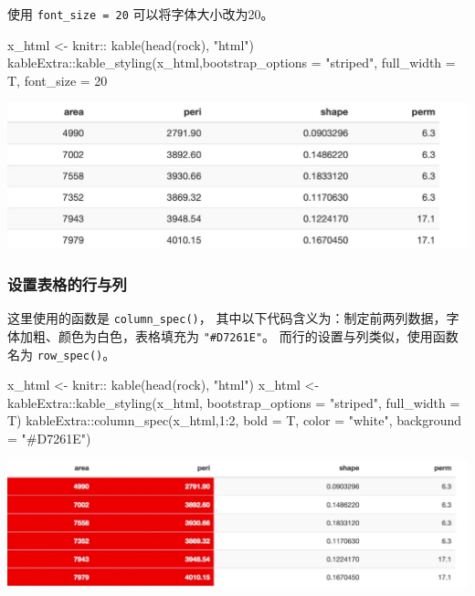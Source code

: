 \documentclass[
]{book}
\newenvironment{Shaded}{\begin{snugshade}}{\end{snugshade}}
\newcommand{\NormalTok}[1]{#1}
\begin{document}
使用 \texttt{font\_size\ =\ 20} 可以将字体大小改为20。

\begin{Shaded}
\begin{Highlighting}[]
\NormalTok{x\_html \textless{}{-} knitr:: kable(head(rock), "html")}
\NormalTok{kableExtra::kable\_styling(x\_html,bootstrap\_options = "striped",}
\NormalTok{                          full\_width = T,}
\NormalTok{                          font\_size = 20}
\end{Highlighting}
\end{Shaded}

\includegraphics{images/paste-153F63DA.png}

\hypertarget{ux8bbeux7f6eux8868ux683cux7684ux884cux4e0eux5217}{%
\subsubsection{设置表格的行与列}\label{ux8bbeux7f6eux8868ux683cux7684ux884cux4e0eux5217}}

这里使用的函数是 \texttt{column\_spec()}，
其中以下代码含义为：制定前两列数据，字体加粗、颜色为白色，表格填充为
\texttt{"\#D7261E"}。 而行的设置与列类似，使用函数名为 \texttt{row\_spec()}。

\begin{Shaded}
\begin{Highlighting}[]
\NormalTok{x\_html \textless{}{-} knitr:: kable(head(rock), "html")}
\NormalTok{x\_html \textless{}{-} kableExtra::kable\_styling(x\_html,}
\NormalTok{                                    bootstrap\_options = "striped",}
\NormalTok{                                    full\_width = T)}
\NormalTok{kableExtra::column\_spec(x\_html,1:2,}
\NormalTok{                        bold = T,}
\NormalTok{                        color = "white",}
\NormalTok{                        background = "\#D7261E")}
\end{Highlighting}
\end{Shaded}

\includegraphics{images/paste-CAE96605.png}
\end{document}
